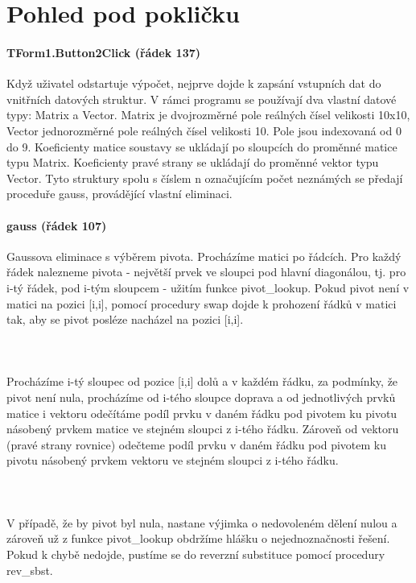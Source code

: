 \documentclass[10pt]{report}
\begin{document}
\section{Pohled pod pokli\v{c}ku}
\paragraph{TForm1.Button2Click (\v{r}\'adek 137)}Kdy\v{z} u\v{z}ivatel odstartuje v\'ypo\v{c}et, nejprve dojde k zaps\'an\'i vstupn\'ich dat do vnit\v{r}n\'ich datov\'ych struktur. V r\'amci programu se pou\v{z}\'ivaj\'i dva vlastn\'i datov\'e typy: Matrix a Vector. Matrix je dvojrozm\v{e}rn\'e pole re\'aln\'ych \v{c}\'isel velikosti 10x10, Vector jednorozm\v{e}rn\'e pole re\'aln\'ych \v{c}\'isel velikosti 10. Pole jsou indexovan\'a od 0 do 9. Koeficienty matice soustavy se ukl\'adaj\'i po sloupc\'ich do prom\v{e}nn\'e matice typu Matrix. Koeficienty prav\'e strany se ukl\'adaj\'i do prom\v{e}nn\'e vektor typu Vector. Tyto struktury spolu s \v{c}\'islem n ozna\v{c}uj\'ic\'im po\v{c}et nezn\'am\'ych se p\v{r}edaj\'i procedu\v{r}e gauss, prov\'ad\v{e}j\'ic\'i vlastn\'i eliminaci.
\paragraph{gauss (\v{r}\'adek 107)}Gaussova eliminace s v\'yb\v{e}rem pivota. Proch\'az\'ime matici po
 \v{r}\'adc\'ich. Pro ka\v{z}d\'y \v{r}\'adek nalezneme pivota - nejv\v{e}t\v{s}\'i prvek ve sloupci
  pod hlavn\'i diagon\'alou, tj. pro i-t\'y \v{r}\'adek, pod i-t\'ym sloupcem -  u\v{z}it\'im funkce
   pivot\_lookup. Pokud pivot nen\'i v matici na pozici [i,i], pomoc\'i procedury swap dojde k
    prohozen\'i \v{r}\'adk\r{u} v matici tak, aby se pivot posl\'eze nach\'azel na pozici [i,i].
 \paragraph{~}
     Proch\'az\'ime i-t\'y sloupec od pozice [i,i] dol\r{u} a v ka\v{z}d\'em \v{r}\'adku, za
      podm\'inky, \v{z}e pivot nen\'i nula, proch\'az\'ime od i-t\'eho sloupce doprava a od
       jednotliv\'ych prvk\r{u} matice i vektoru ode\v{c}\'it\'ame pod\'il prvku v dan\'em \v{r}\'adku
        pod pivotem ku pivotu n\'asoben\'y prvkem matice ve stejn\'em sloupci z i-t\'eho \v{r}\'adku.
        Z\'arove\v{n} od vektoru (prav\'e strany rovnice) ode\v{c}teme pod\'il prvku v dan\'em
         \v{r}\'adku pod pivotem ku pivotu n\'asoben\'y prvkem vektoru ve stejn\'em sloupci z i-t\'eho
          \v{r}\'adku.       
\paragraph{~} V p\v{r}\'ipad\v{e}, \v{z}e by
        pivot byl nula, nastane v\'yjimka o nedovolen\'em d\v{e}len\'i nulou a z\'arove\v{n}
         u\v{z} z funkce pivot\_lookup obdr\v{z}\'ime hl\'a\v{s}ku o nejednozna\v{c}nosti
          \v{r}e\v{s}en\'i. Pokud k chyb\v{e} nedojde, pust\'ime se do reverzn\'i substituce pomoc\'i procedury rev\_sbst.         
\end{document}
